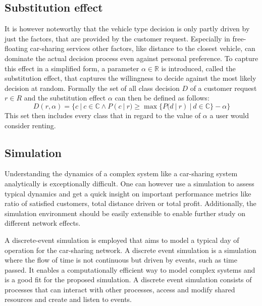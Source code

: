 \subsection{Substitution effect}
\label{sub_sec:Method/Substitution}

It is however noteworthy that the vehicle type decision is only
partly driven by just the factors, that are provided by the customer request. Especially in free-floating car-sharing services
other factors, like distance to the closest vehicle, can dominate the actual decision process even against personal
preference. To capture this effect in a simplified form, a parameter $\alpha \in \mathbb{R}$
is introduced, called the substitution effect, that captures the willingness to decide against the most likely
decision at random. Formally the set of all class decision $D$ of a customer request $r \in R$ and the 
substitution effect $\alpha$ can then be defined as follows:
$$
  D(r, \alpha) = \{ c \ | \ c \in \mathbb{C} \land P(c \ | \ r) \ge \max\{ P(d \ | \ r) \ | \ d \in \mathbb{C} \} - \alpha \}
$$
This set then includes every class that in regard to the value of $\alpha$ a user would consider renting.

\subsection{Simulation}
\label{sub_sec:Method/Simulation}

Understanding the dynamics of a complex system like a car-sharing system analytically is exceptionally difficult.
One can however use a simulation to assess typical dynamics and get a quick insight on important performance metrics
like ratio of satisfied customers, total distance driven or total profit. Additionally, the simulation
environment should be easily extensible to enable further study on different network effects. 


A discrete-event simulation is employed that aims to model a typical day of operation
for the car-sharing network. A discrete event simulation is a simulation where the flow of time is not continuous but driven
by events, such as time passed. It enables a computationally efficient way to model complex systems and is a good fit for the
proposed simulation. A discrete event simulation consists of processes that can interact with other processes, access and modify
shared resources and create and listen to events.



